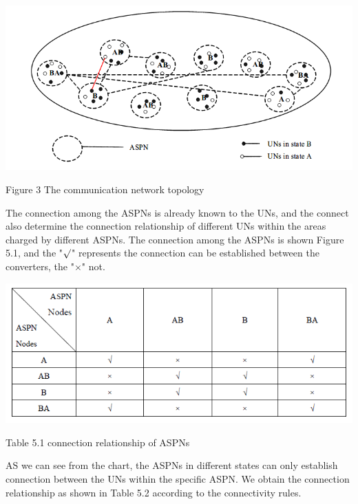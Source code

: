\documentclass{article}
\begin{document}
\centerline{\includegraphics[width=.6\textwidth]{Figure3.png}}
\centerline{Figure 3 The communication network topology }


The connection among the ASPNs is already known to the UNs, and the connect also determine the 
connection relationship of different UNs within the areas charged by different ASPNs. The connection 
among the ASPNs is shown Figure 5.1, and the "\(\surd\)" represents the connection can be established 
between the converters, the "\(\times\)" not.

\par
\centerline{\includegraphics[width=.5\textwidth]{Table1.png}}
\centerline{Table 5.1 connection relationship of ASPNs}

AS we can see from the chart, the ASPNs in different states can only establish connection between the 
UNs within the specific ASPN. We obtain the connection relationship as shown in Table 5.2 according 
to the connectivity rules.
\end{document}
